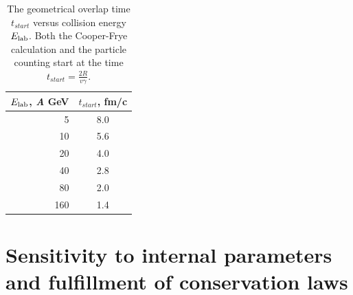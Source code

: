 \begin{table}
  \begin{tabular}{rc}
  \toprule
  $E_\mathrm{lab}$, \emph{A} GeV    &  $t_{start}$, fm/c \\
  \midrule
      5                    &       8.0        \\
      10                   &       5.6        \\
      20                   &       4.0        \\
      40                   &       2.8        \\
      80                   &       2.0        \\
     160                   &       1.4        \\
  \bottomrule
  \end{tabular}
  \caption{The geometrical overlap time $t_{start}$ versus collision energy $E_\mathrm{lab}$.
           Both the Cooper-Frye calculation and the particle counting start at the
           time $t_{start} = \frac{2R}{v\gamma}$.}
  \label{tab:tstart}
\end{table}

\section{Sensitivity to internal parameters and fulfillment of
  conservation laws}
\label{sec:cf_Tests}

